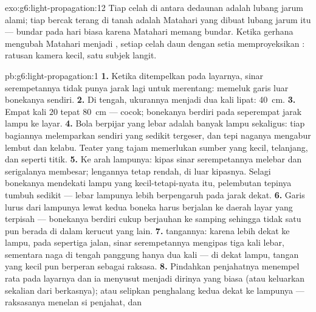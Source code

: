 \begin{solution}{exo:g6:light-propagation:12}
Tiap celah di antara dedaunan adalah lubang jarum alami; tiap bercak
terang di tanah adalah  Matahari yang dibuat lubang jarum itu
--- bundar pada hari biasa karena Matahari memang bundar. Ketika
gerhana mengubah Matahari menjadi , setiap celah daun dengan
setia memproyeksikan : ratusan kamera kecil, satu subjek
langit.
\end{solution}

\begin{solution}{pb:g6:light-propagation:1}
\textbf{1.} Ketika ditempelkan pada layarnya, sinar serempetannya
tidak punya jarak lagi untuk merentang:  memeluk garis
luar bonekanya sendiri.
\textbf{2.} Di tengah, ukurannya menjadi dua kali lipat: \qty{40}{cm}.
\textbf{3.} Empat kali $20$ tepat \qty{80}{cm} --- cocok; bonekanya
berdiri pada seperempat jarak lampu ke layar.
\textbf{4.} Bola berpijar yang lebar adalah banyak lampu sekaligus:
tiap bagiannya melemparkan  sendiri yang sedikit
tergeser, dan tepi naganya mengabur lembut dan kelabu. Teater yang
tajam memerlukan sumber yang kecil, telanjang, dan seperti titik.
\textbf{5.} Ke arah lampunya: kipas sinar serempetannya melebar dan
serigalanya membesar; lengannya tetap rendah, di luar kipasnya. Selagi
bonekanya mendekati lampu yang kecil-tetapi-nyata itu, pelembutan
tepinya tumbuh sedikit --- lebar lampunya lebih berpengaruh pada jarak
dekat.
\textbf{6.} Garis lurus dari lampunya lewat kedua boneka harus
berjalan ke daerah layar yang terpisah --- bonekanya berdiri cukup
berjauhan ke samping sehingga tidak satu pun berada di dalam kerucut
 yang lain.
\textbf{7.}  tangannya: karena lebih dekat ke lampu, pada
sepertiga jalan, sinar serempetannya mengipas tiga kali lebar,
sementara naga di tengah panggung hanya dua kali --- di dekat lampu,
tangan yang kecil pun berperan sebagai raksasa.
\textbf{8.} Pindahkan penjahatnya menempel rata pada layarnya dan ia
menyusut menjadi dirinya yang biasa (atau keluarkan sekalian dari
berkasnya); atau selipkan penghalang kedua dekat ke lampunya ---
 raksasanya menelan  si penjahat, dan

\end{solution}
